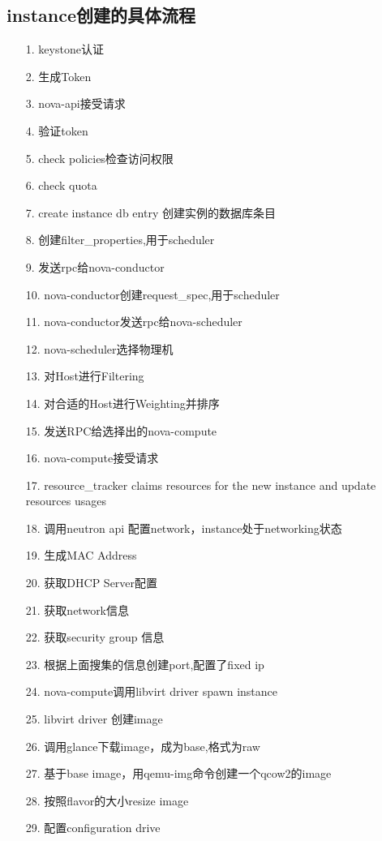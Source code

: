 \documentclass[a4paper,left=1.5cm,right=1.5cm,11pt]{article}
\begin{document}
\begin{nova的体系结构}
\subsection{instance创建的具体流程}
\begin{itemize}
        \item[1.]keystone认证
		\item[2.]生成Token
		\item[3.]nova-api接受请求
		\item[4.]验证token
		\item[5.]check policies检查访问权限
		\item[6.]check quota
		\item[7.]create instance db entry 创建实例的数据库条目
		\item[8.]创建filter_properties,用于scheduler
		\item[9.]发送rpc给nova-conductor
		\item[10.]nova-conductor创建request_spec,用于scheduler
		\item[11.]nova-conductor发送rpc给nova-scheduler
		\item[12.]nova-scheduler选择物理机
		\item[13.]对Host进行Filtering
		\item[14.]对合适的Host进行Weighting并排序
		\item[15.]发送RPC给选择出的nova-compute
		\item[16.]nova-compute接受请求
		\item[17.]resource_tracker claims resources for the new instance and update resources usages
		\item[18.]调用neutron api 配置network，instance处于networking状态
		\item[19.]生成MAC Address
		\item[20.]获取DHCP Server配置
		\item[21.]获取network信息
		\item[22.]获取security group 信息
		\item[23.]根据上面搜集的信息创建port,配置了fixed ip
		\item[24.]nova-compute调用libvirt driver spawn instance
		\item[25.]libvirt driver 创建image
		\item[26.]调用glance下载image，成为base,格式为raw
		\item[27.]基于base image，用qemu-img命令创建一个qcow2的image
		\item[28.]按照flavor的大小resize image
		\item[29.]配置configuration drive

\end{itemize}
\end{nova的体系结构}
\end{document}
